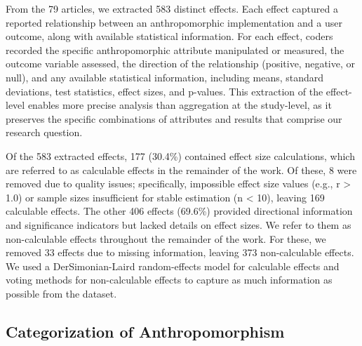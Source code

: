 \documentclass[manuscript,screen,review,anonymous]{acmart}
\DeclareRobustCommand{\change}[1]{%
    \textcolor{changeblue}{#1}%
  }
\DeclareRobustCommand{\change}[1]{#1}
\begin{document}
From the 79 articles, we extracted 583 distinct effects. Each effect captured a reported relationship between an anthropomorphic implementation and a user outcome, along with available statistical information. For each effect, coders recorded the specific anthropomorphic attribute manipulated or measured, the outcome variable assessed, the direction of the relationship (positive, negative, or null), and any available statistical information, including means, standard deviations, test statistics, effect sizes, and p-values. This extraction of the effect-level enables more precise analysis than aggregation at the study-level, as it preserves the specific combinations of attributes and results that comprise our research question.

Of the 583 extracted effects, 177 (30.4\%) contained effect size calculations, which are referred to as calculable effects in the remainder of the work. \change{Of these, 8 were removed due to quality issues; specifically, impossible effect size values (e.g., r > 1.0) or sample sizes insufficient for stable estimation (n < 10), leaving 169 calculable effects.} The other 406 effects (69.6\%) provided directional information and significance indicators but lacked details on effect sizes. We refer to them as non-calculable effects throughout the remainder of the work. For these, we removed 33 effects due to missing information, leaving 373 non-calculable effects. 
We used a DerSimonian-Laird random-effects model for calculable effects and voting methods for non-calculable effects to capture as much information as possible from the dataset.

\subsection{Categorization of Anthropomorphism}
\end{document}
